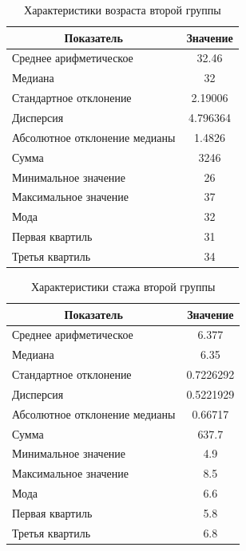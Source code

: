 \begin{table}[H]
	\centering
	\caption{Характеристики возраста второй группы}
	\begin{tabular}{|l|c|}
		\hline
		\multicolumn{1}{|c|}{\textbf{Показатель}} & \textbf{Значение}\\ \hline
		Среднее арифметическое        & 32.46    \\ \hline
		Медиана                       & 32       \\ \hline
		Стандартное отклонение        & 2.19006  \\ \hline
		Дисперсия                      & 4.796364 \\ \hline
		Абсолютное отклонение медианы & 1.4826   \\ \hline
		Сумма                         & 3246     \\ \hline
		Минимальное значение          & 26       \\ \hline
		Максимальное значение         & 37       \\ \hline
		Мода & 32 \\ \hline
		Первая квартиль & 31 \\ \hline
		Третья квартиль & 34 \\ \hline
	\end{tabular}
\end{table}


\begin{table}[H]
	\centering
	\caption{Характеристики стажа второй группы}
	\begin{tabular}{|l|c|}
		\hline
		\multicolumn{1}{|c|}{\textbf{Показатель}} & \textbf{Значение}\\ \hline
		Среднее арифметическое        & 6.377     \\ \hline
		Медиана                       & 6.35      \\ \hline
		Стандартное отклонение        & 0.7226292 \\ \hline
		Дисперсия                      & 0.5221929 \\ \hline
		Абсолютное отклонение медианы & 0.66717   \\ \hline
		Сумма                         & 637.7     \\ \hline
		Минимальное значение          & 4.9       \\ \hline
		Максимальное значение         & 8.5       \\ \hline
		Мода & 6.6 \\ \hline
		Первая квартиль & 5.8 \\ \hline
		Третья квартиль & 6.8 \\ \hline
	\end{tabular}
\end{table}


